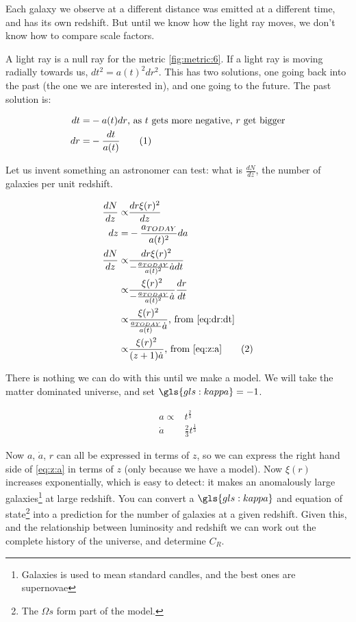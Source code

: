 \documentclass[]{article}
\newcommand\numberthis{\addtocounter{equation}{1}\tag{\theequation}}
\begin{document}
Each galaxy we observe at a different distance was emitted at a different time, and has its own redshift. But until we know how the light ray moves, we don't know how to compare scale factors.

A light ray is a null ray for the metric \eqref{fig:metric:6}. If a light ray is moving radially towards us, $dt^2=a(t)^2dr^2$. This has two solutions, one going back into the past (the one we are interested in), and one going to the future. The past solution is:

\begin{align*}
	dt=&-a(t)dr\text{, as $t$ gets more negative, $r$ get bigger} \\
	dr=&-\frac{dt}{a(t)}\numberthis \label{eq:dr:dt}
\end{align*}

Let us invent something an astronomer can test: what is $\frac{dN}{dz}$, the number of galaxies per unit redshift.

\begin{align*}
	\frac{dN}{dz} \propto& \frac{dr \xi(r)^2}{dz}\\
	dz =& -\frac{a_{TODAY}}{a(t)^2}da\\
	\frac{dN}{dz} \propto& \frac{dr  \xi(r)^2}{-\frac{a_{TODAY}}{a(t)^2}\dot{a}dt}\\
	\propto& \frac{ \xi(r)^2}{-\frac{a_{TODAY}}{a(t)^2}\dot{a}}\frac{dr}{dt}\\
	\propto& \frac{\xi(r)^2}{\frac{a_{TODAY}}{a(t)}\dot{a}} \text{, from \eqref{eq:dr:dt}}\\
	\propto&\frac{\xi(r)^2}{(z+1)\dot{a}} \text{, from \eqref{eq:z:a}} \numberthis \label{dN:dz}
\end{align*}

There is nothing we can do with this until we make a model. We will take the matter dominated universe, and set $\gls{gls:kappa}=-1$.

\begin{align*}
	a \propto& t^\frac{2}{3}\\
	\dot{a}& \frac{2}{3}t^\frac{1}{3}
\end{align*}

Now $a$, $\dot{a}$, $r$ can all be expressed in terms of $z$, so we can express the right hand side of \eqref{eq:z:a} in terms of $z$ (only because we have a model). Now $\xi(r)$ increases exponentially, which is easy to detect: it makes an anomalously large galaxies\footnote{Galaxies is used to mean standard candles, and the best ones are supernovae} at large redshift. You can convert a $\gls{gls:kappa}$ and equation of state\footnote{The $\Omega s$ form part of the model.} into a prediction for the number of galaxies at a given redshift. Given this, and the relationship between luminosity and redshift we can work out the complete history of the universe, and determine $C_R$.
\end{document}
